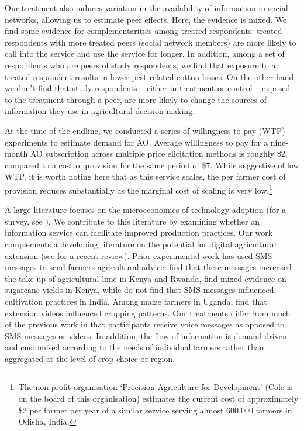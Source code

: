 \documentclass[12pt]{article}
\begin{document}
{\normalsize Our treatment also induces variation in the availability of information 
in social networks, allowing us to estimate peer effects. Here, the evidence is mixed. We find some evidence for complementarities among treated respondents: 
treated respondents with more treated peers (social network members) are more likely to call into the service and use the service for longer. In addition, among a set of respondents who are peers of study respondents, we find that exposure to a treated respondent results in lower pest-related cotton losses.
On the other hand, we don't find that study respondents -- either in treatment or control -- exposed to the treatment through a peer, are more likely to change the sources of information they use in agricultural decision-making.}

{\normalsize At the time of the endline, we conducted a series of willingness to
pay (WTP) experiments to estimate demand for AO. Average willingness to pay for a
nine-month AO subscription across multiple price elicitation methods is
roughly \$2, compared to a cost of provision for the same period of \$7. While suggestive of low WTP, it is worth noting here that as this service scales, the per farmer cost of provision reduces substantially as the marginal cost of scaling is very low.\footnote{The non-profit organisation `Precision Agriculture for Development' (Cole is on the board of this organisation) estimates the current cost of approximately \$2 per farmer per year of a similar service serving almost 600,000 farmers in Odisha, India.}

{\normalsize A large literature focuses on the microeconomics
of technology adoption (for a survey, see \citealp{FR_2010}). We contribute to this literature by examining whether an information service can facilitate improved
production practices. Our work complements a developing literature on the potential for digital agricultural extension (see \citet{fabregas2019realizing} for a recent review). Prior experimental work has used SMS messages to send farmers agricultural advice: \citet{fabregas2018can} find that these messages increased the take-up of agricultural lime in Kenya and Rwanda, \citet{casaburi2014harnessing} find mixed evidence on sugarcane yields in Kenya, while \citet{fafchamps2012impact} do not find that SMS messages influenced cultivation practices in India. Among maize farmers in Uganda, \citet{van2017there} find that extension videos influenced cropping patterns. Our treatments differ from much of the previous work in that participants receive voice messages as opposed to SMS messages or videos. In addition, the flow of information is demand-driven and customised according to the needs of individual farmers rather than aggregated at the level of crop choice or region.}

}
\end{document}
